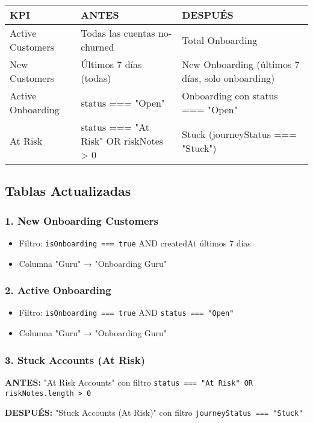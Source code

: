 \documentclass[12pt,a4paper]{article}
\begin{document}
\begin{longtable}{|p{5cm}|p{4cm}|p{5cm}|}
\hline
\textbf{KPI} & \textbf{ANTES} & \textbf{DESPUÉS} \\
\hline
\endhead
Active Customers & Todas las cuentas no-churned & Total Onboarding \\
\hline
New Customers & Últimos 7 días (todas) & New Onboarding (últimos 7 días, solo onboarding) \\
\hline
Active Onboarding & status === "Open" & Onboarding con status === "Open" \\
\hline
At Risk & status === "At Risk" OR riskNotes > 0 & Stuck (journeyStatus === "Stuck") \\
\hline
\end{longtable}

\subsection{Tablas Actualizadas}

\subsubsection{1. New Onboarding Customers}
\begin{itemize}
    \item Filtro: \texttt{isOnboarding === true} AND createdAt últimos 7 días
    \item Columna "Guru" → "Onboarding Guru"
\end{itemize}

\subsubsection{2. Active Onboarding}
\begin{itemize}
    \item Filtro: \texttt{isOnboarding === true} AND \texttt{status === "Open"}
    \item Columna "Guru" → "Onboarding Guru"
\end{itemize}

\subsubsection{3. Stuck Accounts (At Risk)}
\textbf{ANTES:} "At Risk Accounts" con filtro \texttt{status === "At Risk" OR riskNotes.length > 0}

\textbf{DESPUÉS:} "Stuck Accounts (At Risk)" con filtro \texttt{journeyStatus === "Stuck"}
\end{document}
